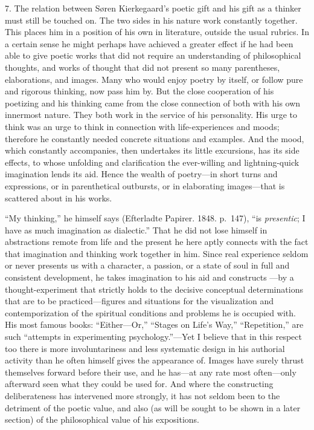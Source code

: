 \documentclass[12pt,a4paper]{book}
\newcommand{\opage}[1]{\marginnote{\footnotesize\textit{[#1]}}}
\begin{document}
7. The relation between Søren Kierkegaard's poetic gift and his gift as a
thinker must still be touched on. The two sides in his nature work
constantly together. This places him in a position of his own in
literature, outside the usual rubrics. In a certain sense he might
perhaps have achieved a greater effect if he had been able to give poetic
works that did not require an understanding of philosophical thoughts,
and works of thought that did not present so many parentheses,
elaborations, and images. Many who would enjoy poetry by itself, or
follow pure and rigorous thinking, now pass him by. But the close
cooperation of his poetizing and his thinking came from the close
connection of both with his own innermost nature. They both work in the
service of his personality. His urge to think was an urge to think in
connection with life-experiences and moods; therefore he constantly
needed concrete situations and examples. And the mood, which constantly
accompanies, then undertakes its little excursions, has its side effects,
to whose unfolding and clarification the ever-willing and lightning-quick
imagination lends its aid. Hence the wealth of poetry---in short turns
and expressions, or in parenthetical outbursts, or in elaborating
images---that is scattered about in his works.

``My thinking,'' he himself says (Efterladte Papirer. 1848. p.~147), ``is
\textit{presentic}; I have as much imagination as dialectic.'' That he
did not lose himself in abstractions remote from life and the present he
here aptly connects with the fact that imagination and thinking work
together in him. Since real experience seldom or never presents us with a
character, a passion, or a state of soul in full and consistent
development, he takes imagination to his aid and constructs
\opage{50}---by a thought-experiment that strictly holds to the decisive
conceptual determinations that are to be practiced---figures and
situations for the visualization and contemporization of the spiritual
conditions and problems he is occupied with. His most famous books:
``Either---Or,'' ``Stages on Life's Way,'' ``Repetition,'' are such
``attempts in experimenting psychology.''---Yet I believe that in this
respect too there is more involuntariness and less systematic design in
his authorial activity than he often himself gives the appearance of.
Images have surely thrust themselves forward before their use, and he
has---at any rate most often---only afterward seen what they could be
used for. And where the constructing deliberateness has intervened more
strongly, it has not seldom been to the detriment of the poetic value,
and also (as will be sought to be shown in a later section) of the
philosophical value of his expositions.
\end{document}
